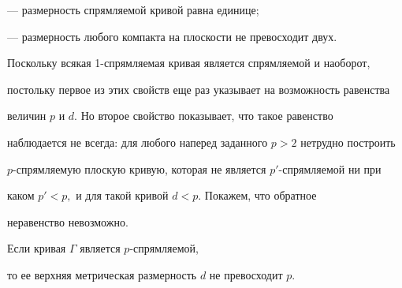 --- размерность спрямляемой кривой равна единице;





--- размерность любого компакта на плоскости не превосходит двух.





Поскольку всякая 1-спрямляемая кривая является спрямляемой и наоборот,


постольку первое из этих свойств еще раз указывает на возможность равенства


величин $p$ и $d$. Но второе свойство показывает, что такое равенство


наблюдается не всегда: для любого наперед заданного $p>2$ нетрудно построить


$p$-спрямляемую плоскую кривую, которая не является $p'$-спрямляемой ни при


каком $p'<p,$ и для такой кривой $d<p.$ Покажем, что обратное


неравенство невозможно.





\begin{prop}


Если кривая $\Gamma$ является $p$-спрямляемой,


то ее верхняя метрическая размерность $d$ не превосходит $p.$


\end{prop}





